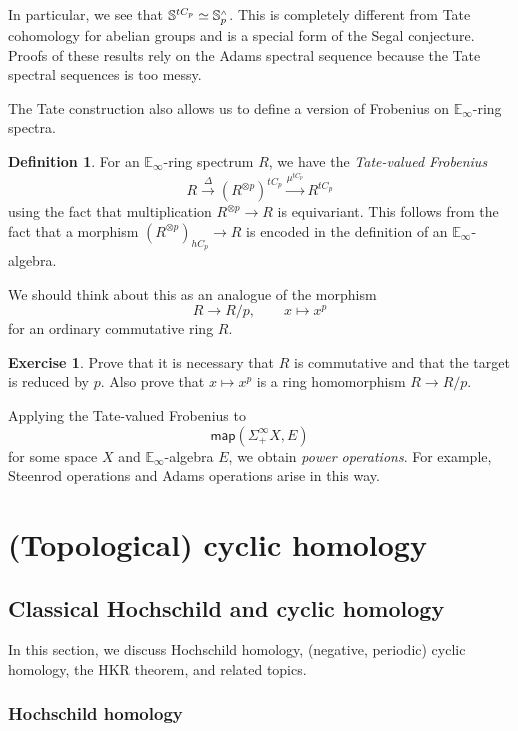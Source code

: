 \documentclass[10pt, oneside]{memoir}
\theoremstyle{definition}
\newtheorem{defn}[thm]{Definition}
\newtheorem{exer}[thm]{Exercise}
\theoremstyle{remark}
\theoremstyle{plain}
\theoremstyle{definition}
\theoremstyle{remark}
\newcommand{\E}{\mathbb{E}}
\newcommand{\bS}{\mathbb{S}}
\newcommand{\ms}[1]{\mathsf{#1}}
\newcommand{\1}{\mathbf{1}}
\newcommand{\2}{\mathbf{2}}
\newcommand{\3}{\mathbf{3}}
\newcommand{\sw}{\mathsmaller{\wedge}}
\begin{document}
In particular, we see that $\bS^{t C_p} \simeq \bS_p^{\sw}$. This is completely different from Tate cohomology for abelian groups and is a special form of the Segal conjecture. Proofs of these results rely on the Adams spectral sequence because the Tate spectral sequences is too messy.

The Tate construction also allows us to define a version of Frobenius on $\E_{\infty}$-ring spectra.
\begin{defn}
    For an $\E_{\infty}$-ring spectrum $R$, we have the \textit{Tate-valued Frobenius}
    \[ R \xrightarrow{\Delta} (R^{\otimes p})^{t C_p} \xrightarrow{\mu^{t C_p}} R^{t C_p} \]
    using the fact that multiplication $R^{\otimes p} \to R$ is equivariant. This follows from the fact that a morphism $(R^{\otimes p})_{h C_p} \to R$ is encoded in the definition of an $\E_{\infty}$-algebra.
\end{defn}

We should think about this as an analogue of the morphism
\[ R \to R/p, \qquad x \mapsto x^p \]
for an ordinary commutative ring $R$.

\begin{exer}
    Prove that it is necessary that $R$ is commutative and that the target is reduced by $p$. Also prove that $x \mapsto x^p$ is a ring homomorphism $R \to R/p$.
\end{exer}

Applying the Tate-valued Frobenius to
\[ \ms{map}(\Sigma_+^{\infty} X, E) \]
for some space $X$ and $\E_{\infty}$-algebra $E$, we obtain \textit{power operations}. For example, Steenrod operations and Adams operations arise in this way.



\chapter{(Topological) cyclic homology}\thispagestyle{firstpage}
\section{Classical Hochschild and cyclic homology}%
\label{sec:Classical Hochschild and cyclic homology}

In this section, we discuss Hochschild homology, (negative, periodic) cyclic homology, the HKR theorem, and related topics.

\subsection{Hochschild homology}%
\label{sub:Hochschild homology}
\end{document}
